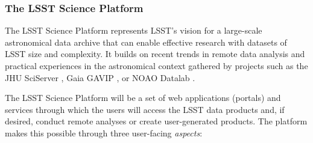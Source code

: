 \subsubsection{The LSST Science Platform}
\label{sec:lsp}

The LSST Science Platform \citep{LSE-319} represents LSST's vision for a
large-scale astronomical data archive that can enable effective research
with datasets of LSST size and complexity.  It builds on recent trends in
remote data analysis and practical experiences in the astronomical context
gathered by projects such as the JHU
SciServer \citep{2017AAS...22923615R}, Gaia GAVIP \citep{2016SPIE.9913E..1VV}, or NOAO Datalab \citep{2016SPIE.9913E..0LF}.

The LSST Science Platform will be a set of web applications (portals) and
services through which the users will access the LSST data products and, if
desired, conduct remote analyses or create user-generated products.  The
platform makes this possible through three user-facing \emph{aspects}:
%
